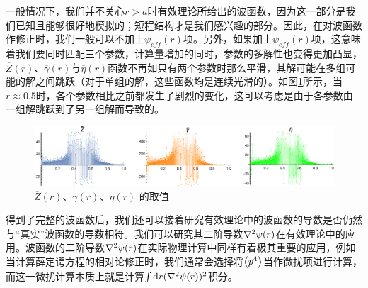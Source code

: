 \documentclass[cs4size,titlepage,twoside]{ctexart}
\begin{document}
一般情况下，我们并不关心$r>a$时有效理论所给出的波函数，因为这一部分是我们已知且能够很好地模拟的；短程结构才是我们感兴趣的部分。因此，在对波函数作修正时，我们一般可以不加上$\psi_{eff}(r)$项。另外，如果加上$\psi_{eff}(r)$项，这意味着我们要同时匹配三个参数，计算量增加的同时，参数的多解性也变得更加凸显，$\overline{Z}(r)$、$\overline{\gamma}(r)$与$\overline{\eta}(r)$函数不再如只有两个参数时那么平滑，其解可能在多组可能的解之间跳跃（对于单组的解，这些函数均是连续光滑的）。如图\ref{figurepara}所示，当$r\approx0.5$时，各个参数相比之前都发生了剧烈的变化，这可以考虑是由于各参数由一组解跳跃到了另一组解而导致的。
\begin{figure}[!htbp]
	\centering
	\includegraphics[width=6in]{psirmodified2_2.eps}
	\caption{$\overline{Z}(r)$、$\overline{\gamma}(r)$、$\overline{\eta}(r)$ 的取值}\label{figurepara}
\end{figure}

得到了完整的波函数后，我们还可以接着研究有效理论中的波函数的导数是否仍然与“真实”波函数的导数相符。我们可以研究其二阶导数$\laplacian{\psi(r)}$在有效理论中的应用。波函数的二阶导数$\laplacian{\psi(r)}$在实际物理计算中同样有着极其重要的应用，例如当计算薛定谔方程的相对论修正时，我们通常会选择将$\expval{p^4}$当作微扰项进行计算，而这一微扰计算本质上就是计算$\int\dd r(\laplacian{\psi(r)})^2$积分。
\end{document}
